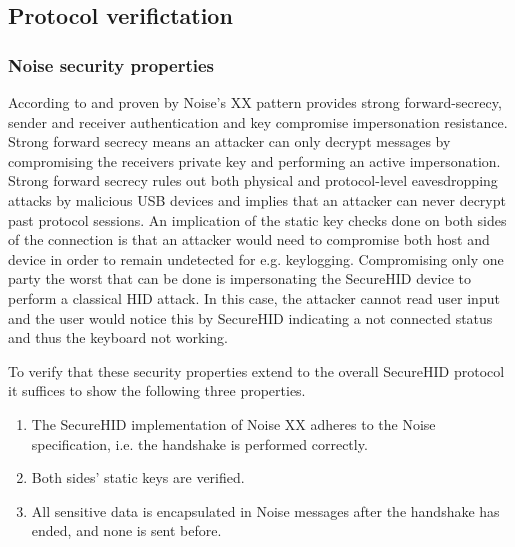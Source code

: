 \documentclass[12pt,a4paper,notitlepage]{article}
\begin{document}
\subsection{Protocol verifictation}
\label{prot_ver}
\subsubsection{Noise security properties}
\label{sec_prop}
According to \textcite{perrin01} and proven by \textcite{kobeissi01} Noise's XX pattern provides strong forward-secrecy,
sender and receiver authentication and key compromise impersonation resistance. Strong forward secrecy means an attacker
can only decrypt messages by compromising the receivers private key and performing an active impersonation.  Strong
forward secrecy rules out both physical and protocol-level eavesdropping attacks by malicious USB devices and implies
that an attacker can never decrypt past protocol sessions. An implication of the static key checks done on both sides of
the connection is that an attacker would need to compromise both host and device in order to remain undetected for e.g.
keylogging.  Compromising only one party the worst that can be done is impersonating the SecureHID device to perform a
classical HID attack. In this case, the attacker cannot read user input and the user would notice this by SecureHID
indicating a not connected status and thus the keyboard not working.

To verify that these security properties extend to the overall SecureHID protocol it suffices to show the following
three properties.
\begin{enumerate}
\item The SecureHID implementation of Noise XX adheres to the Noise specification, i.e. the handshake is performed
	correctly. \label{adh0}
\item Both sides' static keys are verified. \label{adh1}
\item All sensitive data is encapsulated in Noise messages after the handshake has ended, and none is sent before.
	\label{adh2}
\end{enumerate}
\end{document}
